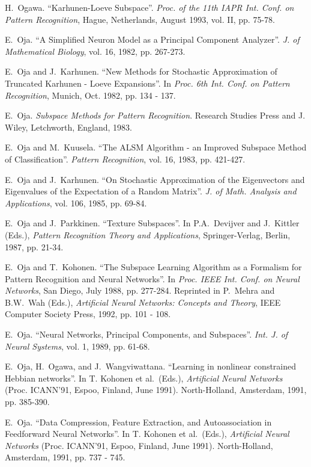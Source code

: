 \begin{thebibliography}{999}
H.~Ogawa.
``Karhunen-Loeve Subspace''.
{\em Proc. of the 11th IAPR Int. Conf. on Pattern Recognition},
Hague, Netherlands, August 1993, vol. II, pp. 75-78.

E.~Oja.
``A Simplified Neuron Model as a Principal Component Analyzer''.
{\em J. of Mathematical Biology}, vol. 16, 1982, pp. 267-273.

E.~Oja and J.~Karhunen.
``New Methods for Stochastic Approximation of Truncated Karhunen -
Loeve Expansions''. In {\em Proc. 6th Int. Conf. on Pattern
Recognition}, Munich, Oct. 1982, pp. 134 - 137.

E.~Oja.
{\em Subspace Methods for Pattern Recognition}.
Research Studies Press and J. Wiley, Letchworth, England,
1983.

E.~Oja and M.~Kuusela.
``The ALSM Algorithm - an Improved Subspace Method of
Classification''. {\em Pattern Recognition}, vol. 16, 1983, pp.
421-427.

E.~Oja and J.~Karhunen. 
``On Stochastic Approximation of the Eigenvectors and Eigenvalues of 
the Expectation of a Random Matrix''. 
{\em J. of Math. Analysis and Applications}, vol. 106, 1985, pp. 69-84.

E.~Oja and J.~Parkkinen.
``Texture Subspaces''. In P.A.~Devijver and J.~Kittler (Eds.), 
{\em Pattern Recognition Theory and Applications}, Springer-Verlag,
Berlin, 1987, pp. 21-34.

E.~Oja and T.~Kohonen.
``The Subspace Learning Algorithm as a Formalism for Pattern Recognition
and Neural Networks''.
In {\em Proc. IEEE Int. Conf. on Neural Networks}, San Diego, July 1988,
pp. 277-284. Reprinted in P.~Mehra and B.W.~Wah (Eds.), {\em
Artificial Neural Networks: Concepts and Theory}, IEEE Computer
Society Press, 1992, pp. 101 - 108. 
 
E.~Oja.
``Neural Networks, Principal Components, and Subspaces''.
{\em Int. J. of Neural Systems},  vol. 1, 1989, pp. 61-68.

E.~Oja, H.~Ogawa, and J.~Wangviwattana.
``Learning in nonlinear constrained Hebbian networks''.
In T. Kohonen et al.\ (Eds.), {\em Artificial Neural Networks} (Proc.
ICANN'91, Espoo, Finland, June 1991). North-Holland, Amsterdam, 1991,
pp. 385-390.

E.~Oja.
``Data Compression, Feature Extraction, and Autoassociation in
Feedforward Neural Networks''. 
In T. Kohonen et al.\ (Eds.), {\em Artificial Neural Networks} (Proc.
ICANN'91, Espoo, Finland, June 1991). North-Holland, Amsterdam, 1991,
pp. 737 - 745.


\end{thebibliography}
